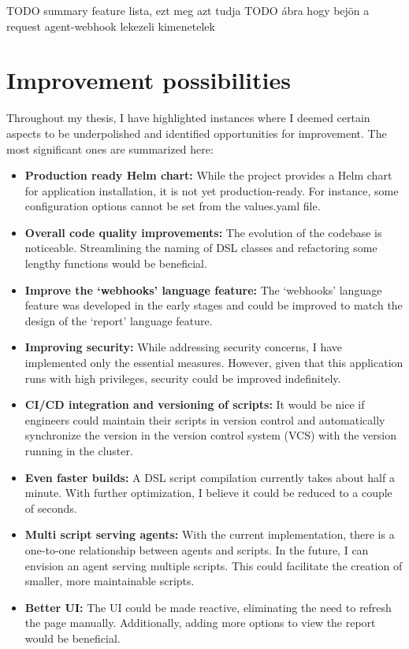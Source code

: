 TODO summary feature lista, ezt meg azt tudja
TODO ábra hogy bejön a request agent-webhook lekezeli kimenetelek

\section{Improvement possibilities}

Throughout my thesis, I have highlighted instances where I deemed certain aspects to be underpolished and identified opportunities for improvement. The most significant ones are summarized here:

\begin{itemize}
\item \textbf{Production ready Helm chart:} While the project provides a Helm chart for application installation, it is not yet production-ready. For instance, some configuration options cannot be set from the values.yaml file.

\item \textbf{Overall code quality improvements:} The evolution of the codebase is noticeable. Streamlining the naming of DSL classes and refactoring some lengthy functions would be beneficial.

\item \textbf{Improve the `webhooks' language feature:} The `webhooks' language feature was developed in the early stages and could be improved to match the design of the `report' language feature.

\item \textbf{Improving security:} While addressing security concerns, I have implemented only the essential measures. However, given that this application runs with high privileges, security could be improved indefinitely. 

\item \textbf{CI/CD integration and versioning of scripts:} It would be nice if engineers could maintain their scripts in version control and automatically synchronize the version in the version control system (VCS) with the version running in the cluster.

\item \textbf{Even faster builds:} A DSL script compilation currently takes about half a minute. With further optimization, I believe it could be reduced to a couple of seconds.

\item \textbf{Multi script serving agents:} With the current implementation, there is a one-to-one relationship between agents and scripts. In the future, I can envision an agent serving multiple scripts. This could facilitate the creation of smaller, more maintainable scripts.

\item \textbf{Better UI:} The UI could be made reactive, eliminating the need to refresh the page manually. Additionally, adding more options to view the report would be beneficial.
\end{itemize}
